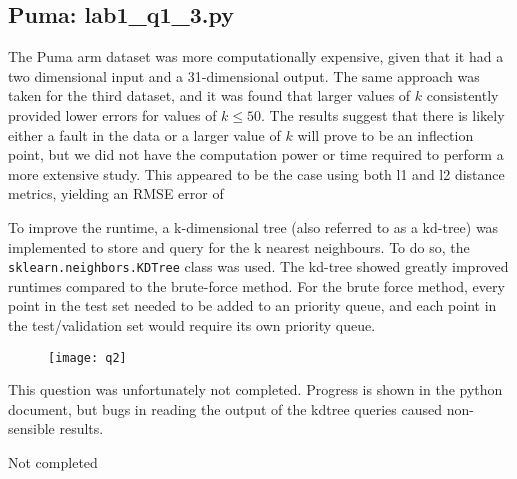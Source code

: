 \subsection{Puma: lab1\_q1\_3.py}
The Puma arm dataset was more computationally expensive, given that it had a two dimensional input and a 31-dimensional output. The same approach was taken for the third dataset, and it was found that larger values of $k$ consistently provided lower errors for values of $k \leq 50$. The results suggest that there is likely either a fault in the data or a larger value of $k$ will prove to be an inflection point, but we did not have the computation power or time required to perform a more extensive study. This appeared to be the case using both l1 and l2 distance metrics, yielding an RMSE error of 

To improve the runtime, a k-dimensional tree (also referred to as a kd-tree) was implemented to store and query for the k nearest neighbours. To do so, the \texttt{sklearn.neighbors.KDTree} class was used. The kd-tree showed greatly improved runtimes compared to the brute-force method. For the brute force method, every point in the test set needed to be added to an priority queue, and each point in the test/validation set would require its own priority queue.

\begin{figure} [h !]
\texttt{[image: q2]}
\centering
\end{figure}


This question was unfortunately not completed. Progress is shown in the python document, but bugs in reading the output of the kdtree queries caused non-sensible results.

Not completed




